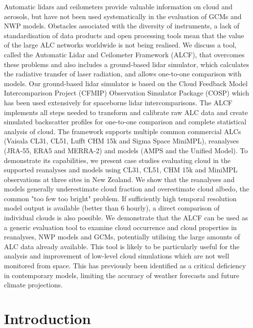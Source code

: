 Automatic lidars and ceilometers provide valuable information on cloud and aerosols, but have not been used systematically in the evaluation of GCMs and NWP models. Obstacles associated with the diversity of instruments, a lack of standardisation of data products and open processing tools mean that the value of the large ALC networks worldwide is not being realised. We discuss a tool, called the
Automatic Lidar and Ceilometer Framework (ALCF), that overcomes these problems and also includes a ground-based lidar simulator, which calculates the radiative transfer of laser radiation, and allows one-to-one comparison with models. Our ground-based lidar simulator is based on the Cloud Feedback Model Intercomparison
Project (CFMIP) Observation Simulator Package (COSP) which has been used extensively for spaceborne lidar intercomparisons. The ALCF
implements all steps needed to transform  and calibrate raw ALC data and create  simulated 
backscatter profiles for one-to-one comparison and complete statistical analysis of cloud. The framework supports multiple common
commercial ALCs (Vaisala CL31, CL51, Lufft CHM 15k and Sigma Space MiniMPL), reanalyses (JRA-55,
ERA5 and MERRA-2) and models (AMPS and the Unified Model). To demonstrate its
capabilities, we present case studies evaluating cloud in the
supported reanalyses and models using CL31, CL51, CHM 15k and MiniMPL
observations at three sites in New Zealand. We show that the reanalyses
and models generally underestimate cloud fraction and overestimate cloud albedo,
the common "too few too bright" problem.
If sufficiently high temporal resolution model output is available (better than 6 hourly), a direct comparison of
individual clouds is also possible. We demonstrate that the ALCF can be used as a generic
evaluation tool to examine cloud occurrence and cloud properties in reanalyses, NWP models and GCMs, potentially utilising the large amounts of ALC data already available. This tool  is likely to be  particularly useful for the analysis and improvement of low-level cloud simulations which are not well monitored from space. This has previously been identified as a critical deficiency in contemporary models, limiting the accuracy of weather forecasts and future climate projections.

\section{Introduction}

